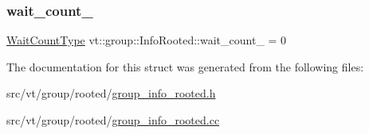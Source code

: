 \subsubsection{\texorpdfstring{wait\+\_\+count\+\_\+}{wait\_count\_}}
{\footnotesize\ttfamily \hyperlink{structvt_1_1group_1_1_info_base_a0924de8df3a2ec72ebdd499ad8a28abf}{Wait\+Count\+Type} vt\+::group\+::\+Info\+Rooted\+::wait\+\_\+count\+\_\+ = 0\hspace{0.3cm}{\ttfamily [protected]}}



The documentation for this struct was generated from the following files\+:\begin{DoxyCompactItemize}
\item 
src/vt/group/rooted/\hyperlink{group__info__rooted_8h}{group\+\_\+info\+\_\+rooted.\+h}\item 
src/vt/group/rooted/\hyperlink{group__info__rooted_8cc}{group\+\_\+info\+\_\+rooted.\+cc}\end{DoxyCompactItemize}
